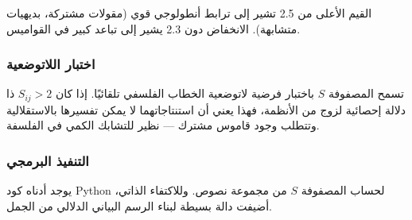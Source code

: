 \documentclass[11pt,a4paper]{article}
\begin{document}
	القيم الأعلى من 2.5 تشير إلى ترابط أنطولوجي قوي (مقولات مشتركة، بديهيات متشابهة). الانخفاض دون 2.3 يشير إلى تباعد كبير في القواميس.
	
	\subsubsection{اختبار اللاتوضعية}
	
	تسمح المصفوفة \(S\) باختبار فرضية لاتوضعية الخطاب الفلسفي تلقائيًا. إذا كان \(S_{ij} > 2\) ذا دلالة إحصائية لزوج من الأنظمة، فهذا يعني أن استنتاجاتهما لا يمكن تفسيرها بالاستقلالية وتتطلب وجود قاموس مشترك — نظير للتشابك الكمي في الفلسفة.
	
	\subsubsection{التنفيذ البرمجي}
	
	يوجد أدناه كود Python لحساب المصفوفة \(S\) من مجموعة نصوص. وللاكتفاء الذاتي، أضيفت دالة بسيطة لبناء الرسم البياني الدلالي من الجمل.
	
\end{document}

